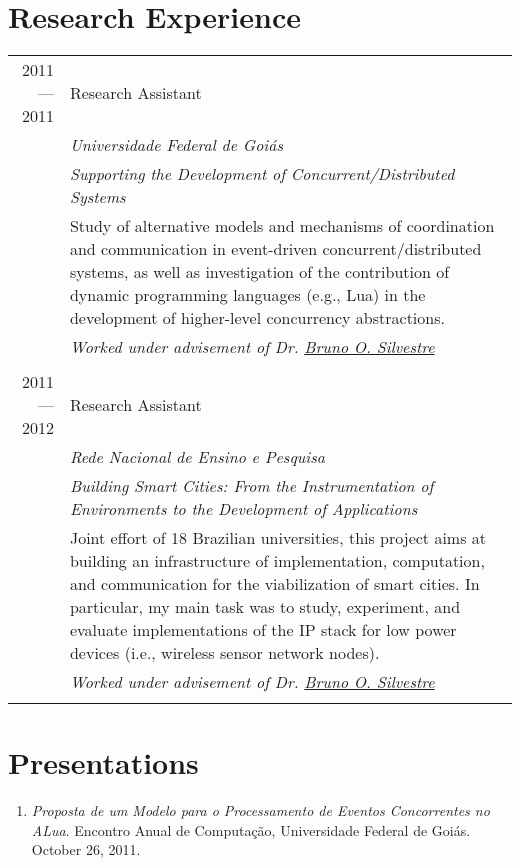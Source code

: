 \documentclass[a4paper,10pt]{article}
\begin{document}
\section{Research Experience}
\begin{tabular}{r|p{11cm}}

  \textsc{2011---2011}
  & Research Assistant \\
  &\emph{Universidade Federal de Goiás}\\
  &\emph{Supporting the Development of Concurrent/Distributed Systems}\\
  &\footnotesize{Study of alternative models and mechanisms of coordination and communication in event-driven
    concurrent/distributed systems, as well as investigation of the contribution of dynamic programming 
    languages (e.g., Lua) in the development of higher-level concurrency abstractions.}\\
  &\emph{Worked under advisement of Dr. \href{http://inf.ufg.br/~brunoos/}{Bruno O. Silvestre}}
  \\\multicolumn{2}{c}{} \\

  \textsc{2011---2012}
  & Research Assistant \\
  &\emph{Rede Nacional de Ensino e Pesquisa}\\
  &\emph{Building Smart Cities: From the Instrumentation of Environments to the Development of Applications}\\
  &\footnotesize{Joint effort of 18 Brazilian universities, this project aims at building an infrastructure of 
    implementation, computation, and communication for the viabilization of smart cities. In particular, my main
    task was to study, experiment, and evaluate implementations of the IP stack for low power devices (i.e., 
    wireless sensor network nodes).}\\
  &\emph{Worked under advisement of Dr. \href{http://inf.ufg.br/~brunoos/}{Bruno O. Silvestre}}
  \\\multicolumn{2}{c}{} \\

\end{tabular}

\pagebreak

\nocite{salazar:1}

\renewcommand\refname{Publications} 



\section{Presentations}
\begin{enumerate}
  \renewcommand{\labelenumi}{[P\arabic{enumi}] }
\item \emph{Proposta de um Modelo para o Processamento de Eventos Concorrentes no ALua}. Encontro Anual de Computação, Universidade Federal de Goiás. October 26, 2011.\\
\end{enumerate}
\end{document}
